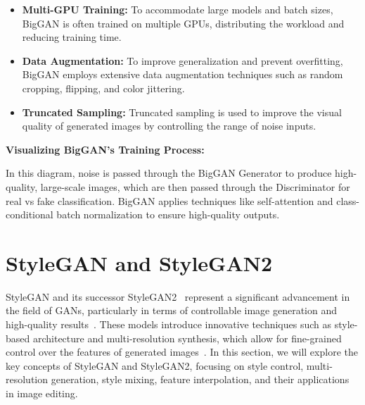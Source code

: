\begin{itemize}
    \item \textbf{Multi-GPU Training:} To accommodate large models and batch sizes, BigGAN is often trained on multiple GPUs, distributing the workload and reducing training time.
    \item \textbf{Data Augmentation:} To improve generalization and prevent overfitting, BigGAN employs extensive data augmentation techniques such as random cropping, flipping, and color jittering.
    \item \textbf{Truncated Sampling:} Truncated sampling is used to improve the visual quality of generated images by controlling the range of noise inputs.
\end{itemize}

\textbf{Visualizing BigGAN's Training Process:}

\begin{center}
\end{center}

In this diagram, noise is passed through the BigGAN Generator to produce high-quality, large-scale images, which are then passed through the Discriminator for real vs fake classification. BigGAN applies techniques like self-attention and class-conditional batch normalization to ensure high-quality outputs.










\section{StyleGAN and StyleGAN2}
StyleGAN and its successor StyleGAN2~\cite{karras2020analyzing} represent a significant advancement in the field of GANs, particularly in terms of controllable image generation and high-quality results~\cite{khan2022transformers}. These models introduce innovative techniques such as style-based architecture and multi-resolution synthesis, which allow for fine-grained control over the features of generated images~\cite{bond2021deep}. In this section, we will explore the key concepts of StyleGAN and StyleGAN2, focusing on style control, multi-resolution generation, style mixing, feature interpolation, and their applications in image editing.

